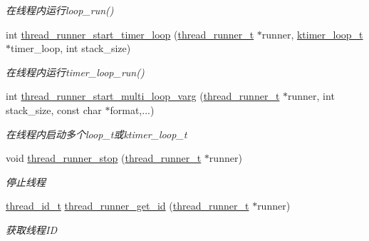 \begin{DoxyCompactItemize}
\begin{DoxyCompactList}\small\item\em 在线程内运行loop\+\_\+run() \end{DoxyCompactList}\item 
int \hyperlink{a00109_ga9191991e2bd7f91fe68324c2855d581d_ga9191991e2bd7f91fe68324c2855d581d}{thread\+\_\+runner\+\_\+start\+\_\+timer\+\_\+loop} (\hyperlink{a00051_a9054159cde2f926ef61c28ce1e555199_a9054159cde2f926ef61c28ce1e555199}{thread\+\_\+runner\+\_\+t} $\ast$runner, \hyperlink{a00051_a024af2aa29615e7a811ea6c45438157d_a024af2aa29615e7a811ea6c45438157d}{ktimer\+\_\+loop\+\_\+t} $\ast$timer\+\_\+loop, int stack\+\_\+size)
\begin{DoxyCompactList}\small\item\em 在线程内运行timer\+\_\+loop\+\_\+run() \end{DoxyCompactList}\item 
int \hyperlink{a00109_ga99f710b40a68688398172bd27470dddf_ga99f710b40a68688398172bd27470dddf}{thread\+\_\+runner\+\_\+start\+\_\+multi\+\_\+loop\+\_\+varg} (\hyperlink{a00051_a9054159cde2f926ef61c28ce1e555199_a9054159cde2f926ef61c28ce1e555199}{thread\+\_\+runner\+\_\+t} $\ast$runner, int stack\+\_\+size, const char $\ast$format,...)
\begin{DoxyCompactList}\small\item\em 在线程内启动多个loop\+\_\+t或ktimer\+\_\+loop\+\_\+t \end{DoxyCompactList}\item 
void \hyperlink{a00109_gaa035f190ffd3d7f117b8fbb58716f042_gaa035f190ffd3d7f117b8fbb58716f042}{thread\+\_\+runner\+\_\+stop} (\hyperlink{a00051_a9054159cde2f926ef61c28ce1e555199_a9054159cde2f926ef61c28ce1e555199}{thread\+\_\+runner\+\_\+t} $\ast$runner)
\begin{DoxyCompactList}\small\item\em 停止线程 \end{DoxyCompactList}\item 
\hyperlink{a00051_ad0ada5642d10ce71bdd90816182f9b79_ad0ada5642d10ce71bdd90816182f9b79}{thread\+\_\+id\+\_\+t} \hyperlink{a00109_gae009856d195b3cd75ad7d0b4b4c10c85_gae009856d195b3cd75ad7d0b4b4c10c85}{thread\+\_\+runner\+\_\+get\+\_\+id} (\hyperlink{a00051_a9054159cde2f926ef61c28ce1e555199_a9054159cde2f926ef61c28ce1e555199}{thread\+\_\+runner\+\_\+t} $\ast$runner)
\begin{DoxyCompactList}\small\item\em 获取线程\+I\+D \end{DoxyCompactList}\item 

\end{DoxyCompactItemize}
